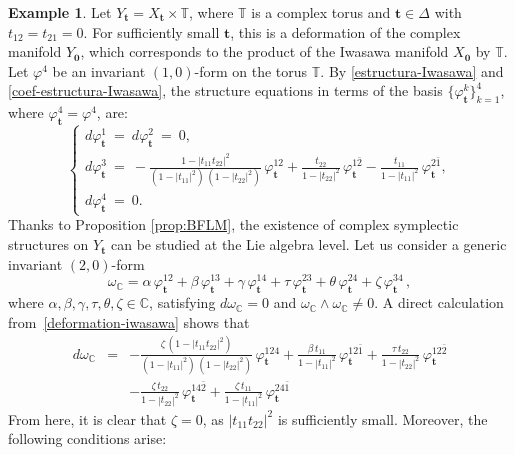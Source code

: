 \documentclass[a4paper]{amsart}
\theoremstyle{definition}
\newtheorem{example}[theorem]{Example}
\theoremstyle{remark}
\newcommand{\bC}{{\mathbb C}}
\numberwithin{equation}{section}
\begin{document}
\begin{example}\label{example-iwasawa}
Let $Y_{\mathbf t}=X_{\mathbf t}\times\mathbb T$, where $\mathbb T$ is a complex torus and
$\mathbf t\in\Delta$ with $t_{12}=t_{21}=0$. 
For sufficiently small $\mathbf t$, this is a deformation of the complex  manifold $Y_{\mathbf 0}$, which corresponds to the product of the Iwasawa manifold $X_{\mathbf 0}$ by $\mathbb T$.
Let $\varphi^4$ be an invariant $(1,0)$-form on the torus $\mathbb T$.
By \eqref{estructura-Iwasawa} and \eqref{coef-estructura-Iwasawa}, the structure equations
in terms of the basis $\{\varphi^k_{\mathbf{t}}\}_{k=1}^4$, where $\varphi^4_{\mathbf{t}}=\varphi^4$, are:
\begin{equation}\label{deformation-iwasawa}
\begin{cases}
d\varphi_{\mathbf{t}}^1 \ = \ d\varphi_{\mathbf{t}}^2 \ = \ 0,\\
d\varphi_{\mathbf{t}}^3 \ = \ -\frac{1-|t_{11}t_{22}|^2}{(1-|t_{11}|^2)\,(1-|t_{22}|^2)}\,\varphi_{\mathbf{t}}^{12} +
  \frac{t_{22}}{1-|t_{22}|^2}\,\varphi_{\mathbf{t}}^{1\bar2} -
   \frac{t_{11}}{1-|t_{11}|^2}\,\varphi_{\mathbf{t}}^{2\bar1},\\
d\varphi_{\mathbf{t}}^4 \ = \ 0.
\end{cases}
\end{equation}
Thanks to Proposition \ref{prop:BFLM}, the existence of complex symplectic structures on $Y_{\mathbf t}$ can be studied at the Lie algebra level. Let us consider a generic invariant $(2,0)$-form
\[
\omega_\bC=\alpha\,\varphi_{\mathbf{t}}^{12}+\beta\,\varphi_{\mathbf{t}}^{13}+\gamma\,\varphi_{\mathbf{t}}^{14}+\tau\,\varphi_{\mathbf{t}}^{23}+\theta\,\varphi_{\mathbf{t}}^{24}+\zeta\,\varphi_{\mathbf{t}}^{34}\,,
\]
where $\alpha,\beta,\gamma,\tau,\theta,\zeta\in\mathbb C$,
satisfying $d\omega_\bC=0$ and $\omega_\bC\wedge\omega_\bC\neq 0$. A direct calculation from~\eqref{deformation-iwasawa} shows that
\[\begin{array}{lcl}
d\omega_\bC &=& -\frac{\zeta\,(1-|t_{11}t_{22}|^2)}{(1-|t_{11}|^2)\,(1-|t_{22}|^2)}\,\varphi_{\mathbf{t}}^{124}
 +\frac{\beta\,t_{11}}{1-|t_{11}|^2}\,\varphi_{\mathbf{t}}^{12\bar1} 
 +\frac{\tau\,t_{22}}{1-|t_{22}|^2}\,\varphi_{\mathbf{t}}^{12\bar2} \\[4pt]
 && 
 -\frac{\zeta\,t_{22}}{1-|t_{22}|^2}\,\varphi_{\mathbf{t}}^{14\bar2}
 +\frac{\zeta\,t_{11}}{1-|t_{11}|^2}\,\varphi_{\mathbf{t}}^{24\bar1}
 \end{array}
\]
From here, it is clear that $\zeta=0$, as $|t_{11}t_{22}|^2$ is sufficiently small. 
Moreover, the following conditions arise:

\end{example}
\end{document}

